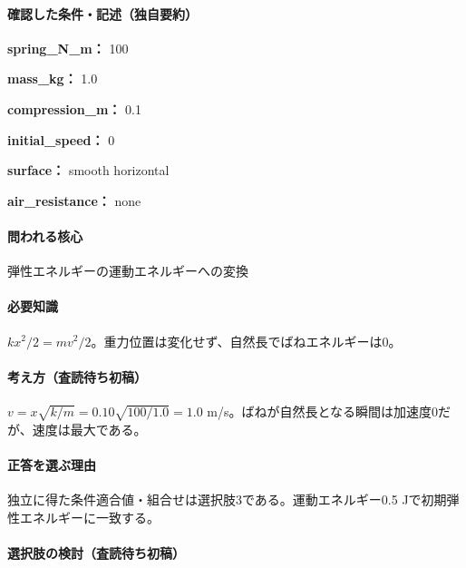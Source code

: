 \paragraph{確認した条件・記述（独自要約）}\mbox{}\par

\noindent\textbf{spring\_N\_m：} 100\par

\noindent\textbf{mass\_kg：} 1.0\par

\noindent\textbf{compression\_m：} 0.1\par

\noindent\textbf{initial\_speed：} 0\par

\noindent\textbf{surface：} smooth horizontal\par

\noindent\textbf{air\_resistance：} none\par

\paragraph{問われる核心} 弾性エネルギーの運動エネルギーへの変換

\paragraph{必要知識} \(kx^2/2=mv^2/2\)。重力位置は変化せず、自然長でばねエネルギーは0。

\paragraph{考え方（査読待ち初稿）} \(v=x\sqrt{k/m}=0.10\sqrt{100/1.0}=1.0\) m/s。ばねが自然長となる瞬間は加速度0だが、速度は最大である。

\paragraph{正答を選ぶ理由} 独立に得た条件適合値・組合せは選択肢3である。運動エネルギー0.5 Jで初期弾性エネルギーに一致する。

\paragraph{選択肢の検討（査読待ち初稿）}\mbox{}\par

